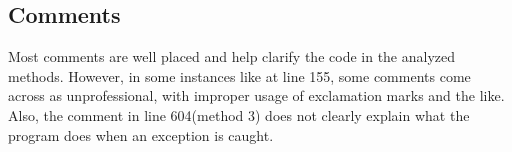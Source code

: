\subsection{Comments}
Most comments are well placed and help clarify the code in the analyzed methods. However, in some instances like at line 155, some comments come across as unprofessional, with
improper usage of exclamation marks and the like. Also, the comment in line 604(method 3) does not clearly explain what the program does when an exception is caught.